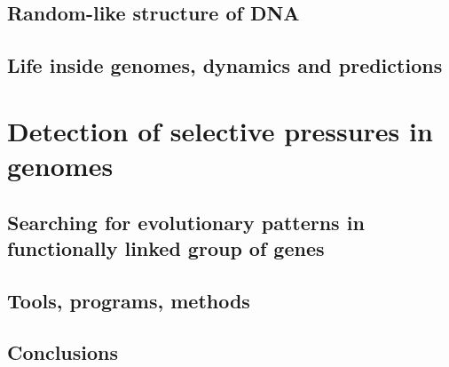 \documentclass[english,b5paper,11pt]{scrbook}
\begin{document}
\chapter{Random-like structure of DNA} 
\label{chap:dna_struct}


\chapter{Life inside genomes, dynamics and predictions} 
\label{chap:untb_genomes}




\part{Detection of selective pressures in genomes}

\chapter{Searching for evolutionary patterns in functionally linked group of genes} 
\label{chap:gssa}


\chapter{Tools, programs, methods} 
\label{chap:tools}


\chapter{Conclusions} 
\label{conclusion}



\begin{titlepage}
  \fancyhf{}
\end{titlepage}


 \label{thebibliograhy}


 \label{listoffig}
\listoffigures
{}

 \label{listoftables}
\listoftables
{}

\newpage
{}
{}
\printglossaries
\label{theglossary}

\newpage
{}

\end{document}

